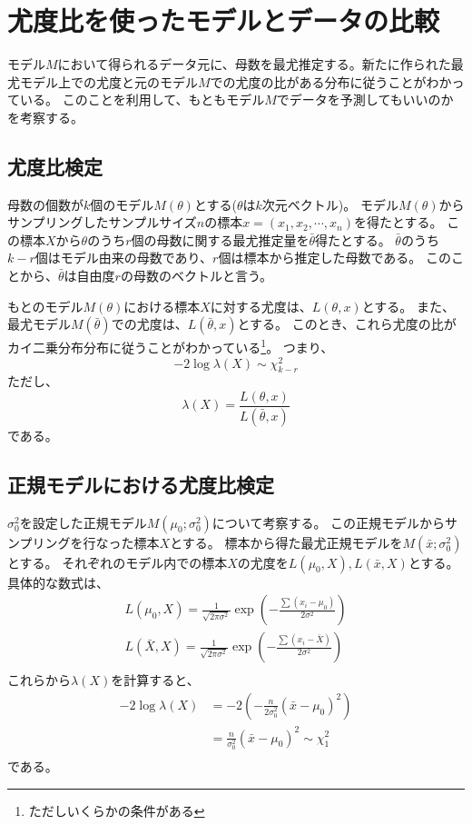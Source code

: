 
\chapter{尤度比を使ったモデルとデータの比較}
モデル$M$において得られるデータ元に、母数を最尤推定する。新たに作られた最尤モデル上での尤度と元のモデル$M$での尤度の比がある分布に従うことがわかっている。
このことを利用して、もともモデル$M$でデータを予測してもいいのかを考察する。

\section{尤度比検定}
母数の個数が$k$個のモデル$M(\theta)$とする($\theta$は$k$次元ベクトル)。
モデル$M(\theta)$からサンプリングしたサンプルサイズ$n$の標本$x=(x_1,x_2,\cdots,x_n)$を得たとする。
この標本$X$から$\theta$のうち$r$個の母数に関する最尤推定量を$\bar{\theta}$得たとする。
$\bar{\theta}$のうち$k-r$個はモデル由来の母数であり、$r$個は標本から推定した母数である。
このことから、$\bar{\theta}$は自由度$r$の母数のベクトルと言う。

もとのモデル$M(\theta)$における標本$X$に対する尤度は、$L(\theta,x)$とする。
また、最尤モデル$M(\bar{\theta})$での尤度は、$L(\bar{\theta},x)$とする。
このとき、これら尤度の比がカイ二乗分布分布に従うことがわかっている\footnote{ただしいくらかの条件がある}。
つまり、
\begin{equation*}
    -2\log\lambda(X)\sim \chi^2_{k-r}
\end{equation*}
ただし、
\begin{equation*}
    \lambda(X) = \frac{L(\theta,x)}{L(\bar{\theta},x)} 
\end{equation*}
である。

\section{正規モデルにおける尤度比検定}

$\sigma^2_0$を設定した正規モデル$M(\mu_0;\sigma^2_0)$について考察する。
この正規モデルからサンプリングを行なった標本$X$とする。
標本から得た最尤正規モデルを$M(\bar{x};\sigma^2_0)$とする。
それぞれのモデル内での標本$X$の尤度を$L(\mu_0,X),L(\bar{x},X)$とする。
具体的な数式は、
\begin{align}
    L(\mu_0,X)=\frac{1}{\sqrt{2\pi\sigma^2}}\exp(-\frac{\sum(x_i-\mu_0)}{2\sigma^2})\\
    L(\bar{X},X)=\frac{1}{\sqrt{2\pi\sigma^2}}\exp(-\frac{\sum(x_i-\bar{X})}{2\sigma^2})\\
\end{align}
これらから$\lambda(X)$を計算すると、
\begin{align}
    -2\log\lambda(X) &= -2(-\frac{n}{2\sigma^2_0}(\bar{x}-\mu_0)^2) \\
    &= \frac{n}{\sigma^2_0}(\bar{x}-\mu_0)^2 \sim \chi^2_1 \\
\end{align}
である。

